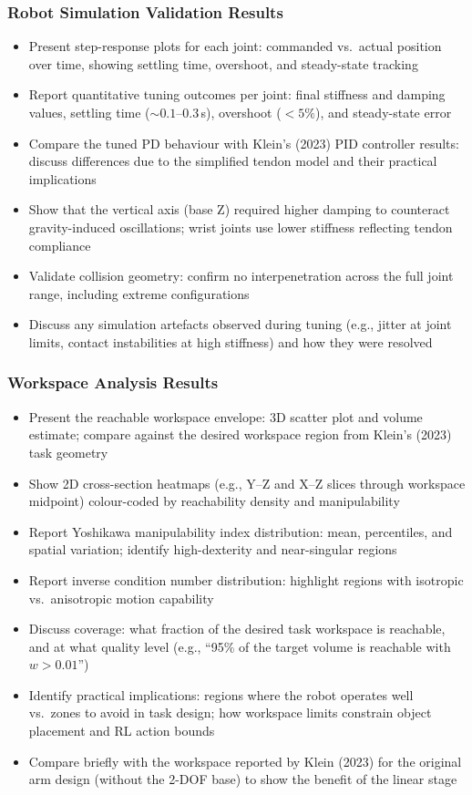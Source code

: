 \subsubsection{Robot Simulation Validation Results}
\begin{itemize}
    \item Present step-response plots for each joint: commanded vs.\ actual position over time, showing settling time, overshoot, and steady-state tracking
    \item Report quantitative tuning outcomes per joint: final stiffness and damping values, settling time ($\sim 0.1$--$0.3$\,s), overshoot ($< 5\%$), and steady-state error
    \item Compare the tuned PD behaviour with Klein's (2023) PID controller results: discuss differences due to the simplified tendon model and their practical implications
    \item Show that the vertical axis (base Z) required higher damping to counteract gravity-induced oscillations; wrist joints use lower stiffness reflecting tendon compliance
    \item Validate collision geometry: confirm no interpenetration across the full joint range, including extreme configurations
    \item Discuss any simulation artefacts observed during tuning (e.g., jitter at joint limits, contact instabilities at high stiffness) and how they were resolved
\end{itemize}

\subsubsection{Workspace Analysis Results}
\begin{itemize}
    \item Present the reachable workspace envelope: 3D scatter plot and volume estimate; compare against the desired workspace region from Klein's (2023) task geometry
    \item Show 2D cross-section heatmaps (e.g., Y--Z and X--Z slices through workspace midpoint) colour-coded by reachability density and manipulability
    \item Report Yoshikawa manipulability index distribution: mean, percentiles, and spatial variation; identify high-dexterity and near-singular regions
    \item Report inverse condition number distribution: highlight regions with isotropic vs.\ anisotropic motion capability
    \item Discuss coverage: what fraction of the desired task workspace is reachable, and at what quality level (e.g., ``95\% of the target volume is reachable with $w > 0.01$'')
    \item Identify practical implications: regions where the robot operates well vs.\ zones to avoid in task design; how workspace limits constrain object placement and RL action bounds
    \item Compare briefly with the workspace reported by Klein (2023) for the original arm design (without the 2-DOF base) to show the benefit of the linear stage
\end{itemize}

